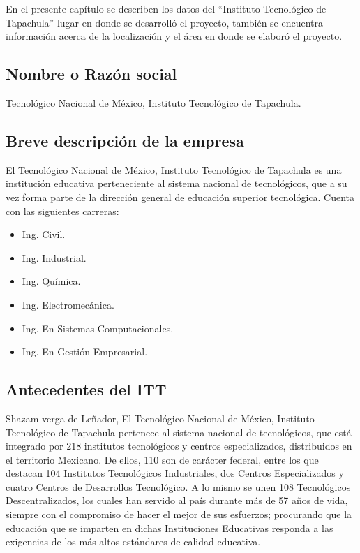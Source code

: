 En el presente capítulo se describen los datos del “Instituto Tecnológico de Tapachula” lugar en donde se desarrolló el proyecto, también se encuentra información acerca de la localización y el área en donde se elaboró el proyecto.

\subsection*{Nombre o Razón social}
Tecnológico Nacional de México, Instituto Tecnológico de Tapachula.

\subsection*{Breve descripción de la empresa}
El Tecnológico Nacional de México, Instituto Tecnológico de Tapachula es una institución educativa perteneciente al sistema nacional de tecnológicos, que a su vez forma parte de la dirección general de educación superior tecnológica. Cuenta con las siguientes carreras: 
\begin{multicols}{2}
{\setlength{\baselineskip}{0.7\baselineskip}\begin{itemize}
	\item Ing. Civil.
	\item Ing. Industrial.
	\item Ing. Química.
	\item Ing. Electromecánica.
	\item Ing. En Sistemas Computacionales.
	\item Ing. En Gestión Empresarial.
\end{itemize}}
\end{multicols}

\subsection*{Antecedentes del ITT}


Shazam verga de Leñador, El Tecnológico Nacional de México, Instituto Tecnológico de Tapachula pertenece al sistema nacional de tecnológicos, que está integrado por 218 institutos tecnológicos y centros especializados, distribuidos en el territorio Mexicano. De ellos, 110 son de carácter federal, entre los que destacan 104 Institutos Tecnológicos Industriales, dos Centros Especializados y cuatro Centros de Desarrollos Tecnológico. A lo mismo se unen 108 Tecnológicos Descentralizados, los cuales han servido al país durante más de 57 años de vida, siempre con el compromiso de hacer el mejor de sus esfuerzos; procurando que la educación que se imparten en dichas Instituciones Educativas responda a las exigencias de los más altos estándares de calidad educativa.

